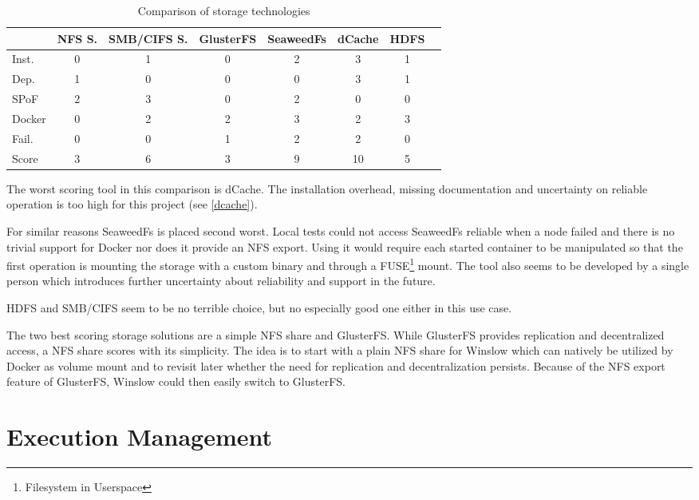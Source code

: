 \begin{table}[H]
	\begin{tabular}{l|c|c|c|c|c|c|c}
				& NFS S.& SMB/CIFS S.& GlusterFS & SeaweedFs	& dCache 	& HDFS \\
		\hline
		Inst. 	& 0 	& 1 		& 0 		& 2 		& 3			& 1 \\
		Dep. 	& 1 	& 0			& 0 		& 0 		& 3 		& 1 \\
		SPoF 	& 2		& 3			& 0			& 2 		& 0			& 0 \\
		Docker 	& 0 	& 2 		& 2 		& 3 		& 2 		& 3 \\
		Fail.	& 0		& 0			& 1			& 2			& 2			& 0 \\
		\hline
		Score 	& 3		& 6			& 3			& 9			& 10		& 5 \\
	\end{tabular}
	\caption{Comparison of storage technologies}
	\label{comparision:storage}
\end{table}

The worst scoring tool in this comparison is dCache.
The installation overhead, missing documentation and uncertainty on reliable operation is too high for this project (see \autoref{dcache}).

For similar reasons SeaweedFs is placed second worst.
Local tests could not access SeaweedFs reliable when a node failed and there is no trivial support for Docker nor does it provide an NFS export.
Using it would require each started container to be manipulated so that the first operation is mounting the storage with a custom binary and through a FUSE\footnote{Filesystem in Userspace} mount.
The tool also seems to be developed by a single person which introduces further uncertainty about reliability and support in the future.

HDFS and SMB/CIFS seem to be no terrible choice, but no especially good one either in this use case.

The two best scoring storage solutions are a simple NFS share and GlusterFS.
While GlusterFS provides replication and decentralized access, a NFS share scores with its simplicity.
The idea is to start with a plain NFS share for Winslow which can natively be utilized by Docker as volume mount and to revisit later whether the need for replication and decentralization persists.
Because of the NFS export feature of GlusterFS, Winslow could then easily switch to GlusterFS.



\section{Execution Management}

